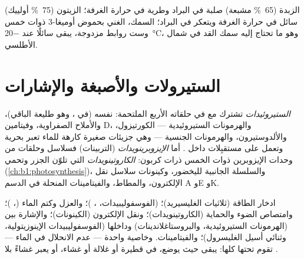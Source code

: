 \begin{example}\label{ex:b1:lipids:kitchen}
الزبدة (\qty{65}{\%} مشبعة) صلبة في البراد وطرية في حرارة الغرفة؛
 الزيتون (\qty{75}{\%}  أولييك) سائل في حرارة الغرفة ويتعكر
في البراد؛  السمك، الغني بحموض أوميغا-3 ذوات خمس وست روابط
مزدوجة، يبقى سائلًا عند \qty{-20}{\celsius}، وهو ما تحتاج إليه 
سمك القد في شمال الأطلسي.
\end{example}

\section{الستيرولات والأصبغة والإشارات}

\begin{definition}\label{def:b1:lipids:steroids}
\emph{الستيروئيدات} تشترك مع  في حلقاته
الأربع الملتحمة:  نفسه (في ، وهو طليعة الباقي)،
والأملاح الصفراوية، وفيتامين D، والهرمونات الستيروئيدية ---
الكورتيزول، والألدوستيرون، والهرمونات الجنسية --- وهي جزيئات صغيرة
كارهة للماء تعبر  بحرية وتعمل على مستقبِلات داخل . أما
\emph{الإيزوبرينويدات} (التربينات) فسلاسل وحلقات
من وحدات الإيزوبرين ذوات الخمس ذرات كربون: \emph{الكاروتينويدات}
التي تلوّن الجزر وتحمي 
(\cref{ch:b1:photosynthesis})، والسلسلة الجانبية لليخضور، وكينونات
سلاسل نقل الإلكترون، والمطاط، والفيتامينات المنحلة في الدسم A وE
وK.
\end{definition}

\begin{proposition}\label{prop:b1:lipids:functions}
ادخار الطاقة (ثلاثيات الغليسيريد)؛  (الفوسفوليبيدات،
، )؛ والعزل وكتم الماء (، )؛
وامتصاص الضوء والحماية (الكاروتينويدات)؛ ونقل الإلكترون (الكينونات)؛
والإشارة بين  (الهرمونات الستيروئيدية، والبروستاغلاندينات)
وداخلها (الفوسفوليبيدات الإينوزيتولية، وثنائي أسيل الغليسرول)؛
والفيتامينات. وخاصية واحدة --- عدم الانحلال في الماء --- تقوم تحتها
كلها:  يبقى حيث يوضع، في قطيرة أو غلالة أو غشاء، أو يعبر غشاءً
بلا .
\end{proposition}


